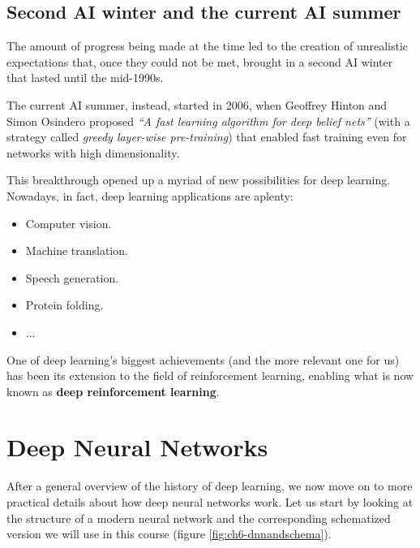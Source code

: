 \subsection{Second AI winter and the current AI summer}
The amount of progress being made at the time led to the creation of unrealistic expectations that, once they could not be met, brought in a second AI winter that lasted until the mid-1990s.

The current AI summer, instead, started in 2006, when Geoffrey Hinton and Simon Osindero proposed \textit{``A fast learning algorithm for deep belief nets''}  \cite{10.1162/neco.2006.18.7.1527} (with a strategy called \textit{greedy layer-wise pre-training}) that enabled fast training even for networks with high dimensionality.

This breakthrough opened up a myriad of new possibilities for deep learning. Nowadays, in fact, deep learning applications are aplenty: 

\begin{itemize}
    \item Computer vision.
    \item Machine translation.
    \item Speech generation.
    \item Protein folding.
    \item ...
\end{itemize}

One of deep learning's biggest achievements (and the more relevant one for us) has been its extension to the field of reinforcement learning, enabling what is now known as \textbf{deep reinforcement learning}.

\section{Deep Neural Networks}
After a general overview of the history of deep learning, we now move on to more practical details about how deep neural networks work. Let us start by looking at the structure of a modern neural network and the corresponding schematized version we will use in this course (figure \ref{fig:ch6-dnnandschema}).


